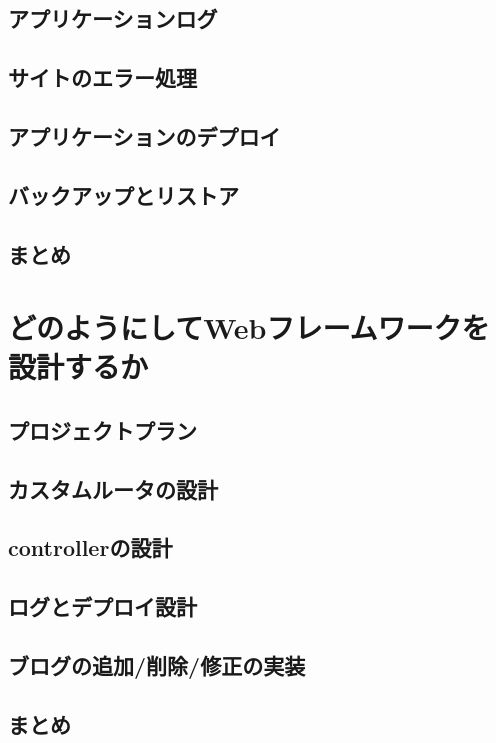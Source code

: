\subsection{アプリケーションログ}

\subsection{サイトのエラー処理}

\subsection{アプリケーションのデプロイ}

\subsection{バックアップとリストア}

\subsection{まとめ}


\section{どのようにしてWebフレームワークを設計するか}

\subsection{プロジェクトプラン}

\subsection{カスタムルータの設計}

\subsection{controllerの設計}

\subsection{ログとデプロイ設計}

\subsection{ブログの追加/削除/修正の実装}

\subsection{まとめ}


